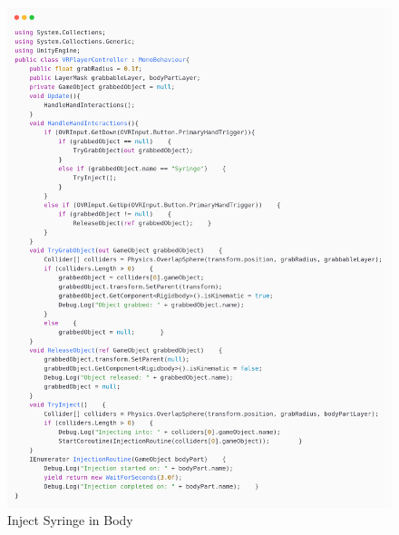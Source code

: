 \begin{figure}[h] 
	\centering
	\includegraphics[width=1\textwidth, height=0.7\textheight]{Images/inject syringe.png}
	\caption{Inject Syringe in Body}
	\label{fig:Inject Syringe in Body}
\end{figure}
\newpage
